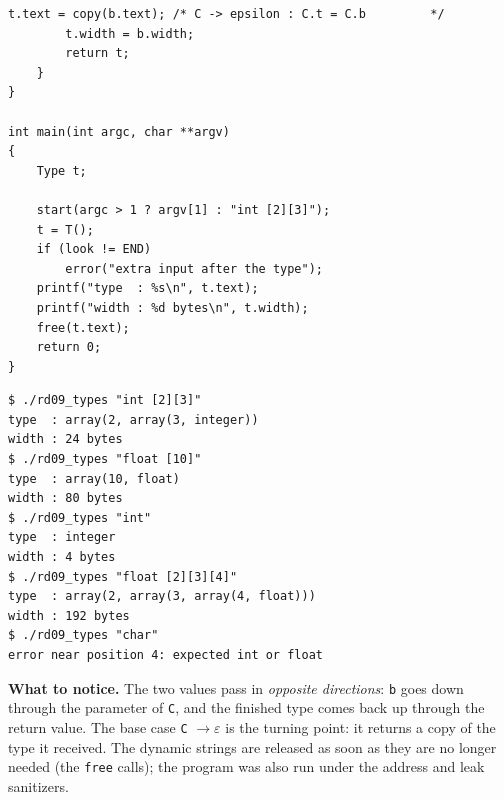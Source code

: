 \documentclass[11pt,a4paper]{article}
\begin{document}
\begin{lstlisting}[basicstyle=\ttfamily\footnotesize,tabsize=4]
        t.text = copy(b.text); /* C -> epsilon : C.t = C.b         */
        t.width = b.width;
        return t;
    }
}

int main(int argc, char **argv)
{
    Type t;

    start(argc > 1 ? argv[1] : "int [2][3]");
    t = T();
    if (look != END)
        error("extra input after the type");
    printf("type  : %s\n", t.text);
    printf("width : %d bytes\n", t.width);
    free(t.text);
    return 0;
}
\end{lstlisting}

\begin{lstlisting}[basicstyle=\ttfamily\footnotesize,tabsize=4]
$ ./rd09_types "int [2][3]"
type  : array(2, array(3, integer))
width : 24 bytes
$ ./rd09_types "float [10]"
type  : array(10, float)
width : 80 bytes
$ ./rd09_types "int"
type  : integer
width : 4 bytes
$ ./rd09_types "float [2][3][4]"
type  : array(2, array(3, array(4, float)))
width : 192 bytes
$ ./rd09_types "char"
error near position 4: expected int or float
\end{lstlisting}

\textbf{What to notice.} The two values pass in \emph{opposite directions}: \texttt{b} goes down through the parameter of \texttt{C}, and the finished type comes back up through the return value. The base case \texttt{C} $\to\varepsilon$ is the turning point: it returns a copy of the type it received. The dynamic strings are released as soon as they are no longer needed (the \texttt{free} calls); the program was also run under the address and leak sanitizers.
\end{document}
